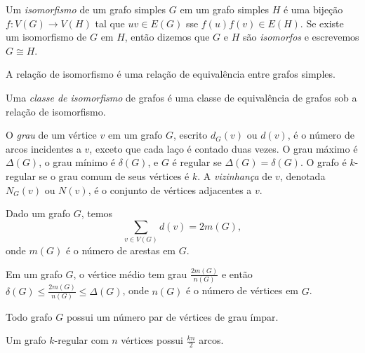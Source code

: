 \documentclass{article}
\begin{document}
\begin{defn}
    Um \emph{isomorfismo} de um grafo simples \(G\) em um grafo simples \(H\) é uma bijeção \(f: V(G) \to V(H)\) tal que \(uv \in E(G)\) sse \(f(u)f(v) \in E(H)\). Se existe um isomorfismo de \(G\) em \(H\), então dizemos que \(G\) e \(H\) são \emph{isomorfos} e escrevemos \(G \cong H\).
\end{defn}

\begin{prop}
    A relação de isomorfismo é uma relação de equivalência entre grafos simples.
\end{prop}

\begin{defn}
    Uma \emph{classe de isomorfismo} de grafos é uma classe de equivalência de grafos sob a relação de isomorfismo.
\end{defn}

\begin{defn}
    O \emph{grau} de um vértice \(v\) em um grafo \(G\), escrito \(d_G(v)\) ou \(d(v)\), é o número de arcos incidentes a \(v\), exceto que cada laço é contado duas vezes. O grau máximo é \(\Delta(G)\), o grau mínimo é \(\delta(G)\), e \(G\) é regular se \(\Delta(G) = \delta(G)\).
    O grafo é \(k\)-regular se o grau comum de seus vértices é \(k\). A \emph{vizinhança} de \(v\), denotada \(N_G(v)\) ou \(N(v)\), é o conjunto de vértices adjacentes a \(v\).
\end{defn}

\begin{lem} 
    Dado um grafo \(G\), temos 
    \begin{equation}
        \sum_{v \in V(G)} d(v) = 2 m(G),
    \end{equation}
    \noindent onde \(m(G)\) é o número de arestas em \(G\).
\end{lem}

\begin{cor}
    Em um grafo \(G\), o vértice médio tem grau \(\displaystyle \frac{2 m(G)}{n(G)}\) e então \(\delta(G) \leq \displaystyle \frac{2 m(G)}{n(G)} \leq \Delta(G)\), onde \(n(G)\) é o número de vértices em \(G\).
\end{cor}

\begin{cor}
    Todo grafo \(G\) possui um número par de vértices de grau ímpar.
\end{cor}

\begin{cor}
    Um grafo \(k\)-regular com \(n\) vértices possui \(\displaystyle \frac{kn}{2}\) arcos.
\end{cor}
\end{document}
